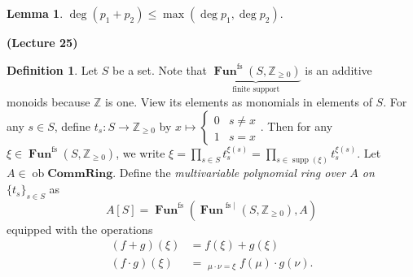 \documentclass[10pt,letterpaper,cm]{nupset}
\theoremstyle{definition}
\newtheorem*{definition}{Definition}
\newtheorem{lemma}{Lemma}
\newcommand{\Z}{\mathbb Z}
\newcommand{\1}{\mathbf{1}}
\newcommand{\0}{\vec 0}
\DeclareMathOperator{\ob}{ob}
\DeclareMathOperator{\fs}{fs}
\DeclareMathOperator{\Fun}{\mathbf{Fun}}
\DeclareMathOperator{\supp}{supp}
\begin{document}
\begin{lemma}
$\deg(p_1 + p_2) \leq \max(\deg p_1, \deg p_2)$.
\end{lemma}

\begin{center}
{\textbf{(Lecture 25)}}
\end{center}

\begin{definition}
Let $S$ be a set. Note that $\underbrace{\Fun^{\fs}(S, \Z_{\geq 0})}_{\text{finite support}}$ is an additive monoids because $\Z$ is one. View its elements as monomials in elements of $S$. For any $s\in S$, define $t_s : S \to \Z_{\geq 0}$ by $x \mapsto \begin{cases} 0 & s \ne x \\ 1 & s =x \end{cases}.$ Then for any $\xi \in \Fun^{\fs}(S, \Z_{\geq 0})$, we write $\xi = \prod_{s\in S}t_s^{\xi(s)} =\prod_{s\in \supp(\xi)}t_s^{\xi(s)}$.
Let $A \in \ob \mathbf{CommRing}$. Define the \textit{multivariable polynomial ring over $A$ on $\{t_s\}_{s\in S}$} as $$A[S] = \Fun^{\fs}(\Fun^{\fs|}(S, \Z_{\geq 0}), A)$$ equipped with the operations
\begin{align*}
(f+g)(\xi) &= f(\xi) +g(\xi)
\\ (f\cdot g)(\xi) & = \mathop{\sum_{\mu, \nu}}_{\mu \cdot \nu = \xi} f(\mu) \cdot g(\nu).
\end{align*}
\end{definition}
\end{document}
